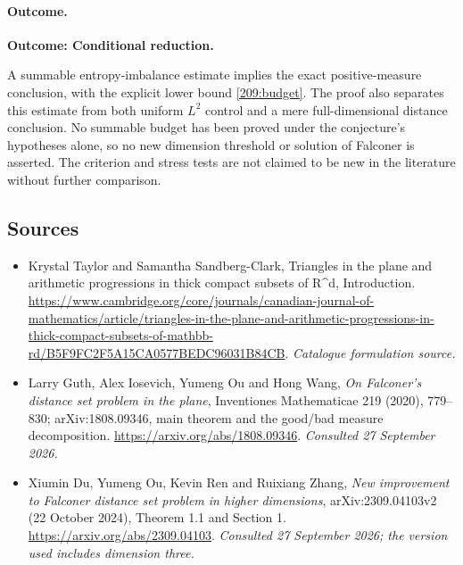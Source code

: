 \documentclass[11pt,a4paper]{article}
\begin{document}
\paragraph{Outcome.}
\textbf{Outcome: Conditional reduction.}

A summable entropy-imbalance estimate implies the exact positive-measure
conclusion, with the explicit lower bound \eqref{209:budget}. The proof
also separates this estimate from both uniform $L^2$ control and a mere
full-dimensional distance conclusion. No summable budget has been proved
under the conjecture's hypotheses alone, so no new dimension threshold or
solution of Falconer is asserted. The criterion and stress tests are
not claimed to be new in the literature without further comparison.
\subsection{Sources}
\begin{itemize}\raggedright
\item[\textnormal{[S1]}]\hypertarget{source:209:1}{} Krystal Taylor and Samantha Sandberg-Clark, Triangles in the plane and arithmetic progressions in thick compact subsets of R\textasciicircum{}d, Introduction.
\url{https://www.cambridge.org/core/journals/canadian-journal-of-mathematics/article/triangles-in-the-plane-and-arithmetic-progressions-in-thick-compact-subsets-of-mathbb-rd/B5F9FC2F5A15CA0577BEDC96031B84CB}.
{\small\textit{Catalogue formulation source.}}
\item[\textnormal{[E1]}]\hypertarget{extra:209:1}{} Larry Guth, Alex Iosevich, Yumeng Ou and Hong Wang,
\emph{On Falconer's distance set problem in the plane}, Inventiones Mathematicae
219 (2020), 779--830; arXiv:1808.09346, main theorem and the good/bad measure decomposition.
\url{https://arxiv.org/abs/1808.09346}.
{\small\textit{Consulted 27 September 2026.}}
\item[\textnormal{[E2]}]\hypertarget{extra:209:2}{} Xiumin Du, Yumeng Ou, Kevin Ren and Ruixiang Zhang,
\emph{New improvement to Falconer distance set problem in higher dimensions},
arXiv:2309.04103v2 (22 October 2024), Theorem 1.1 and Section 1.
\url{https://arxiv.org/abs/2309.04103}.
{\small\textit{Consulted 27 September 2026; the version used includes dimension three.}}
\end{itemize}
\end{document}
